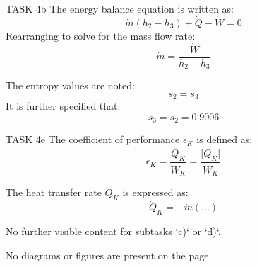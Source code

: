 TASK 4b  
The energy balance equation is written as:  
\[
\dot{m} \left( h_2 - h_3 \right) + \dot{Q} - \dot{W} = 0
\]  
Rearranging to solve for the mass flow rate:  
\[
\dot{m} = \frac{\dot{W}}{h_2 - h_3}
\]  

The entropy values are noted:  
\[
s_2 = s_3
\]  
It is further specified that:  
\[
s_3 = s_2 = 0.9006
\]  

TASK 4e  
The coefficient of performance \( \epsilon_K \) is defined as:  
\[
\epsilon_K = \frac{\dot{Q}_K}{\dot{W}_K} = \frac{\lvert \dot{Q}_K \rvert}{\dot{W}_K}
\]  

The heat transfer rate \( \dot{Q}_K \) is expressed as:  
\[
\dot{Q}_K = -\dot{m} \left( \ldots \right)
\]  

No further visible content for subtasks `c)` or `d)`.  

No diagrams or figures are present on the page.